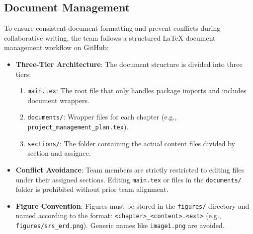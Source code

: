 \subsection{Document Management}

To ensure consistent document formatting and prevent conflicts during collaborative writing, the team follows a structured LaTeX document management workflow on GitHub:
\begin{itemize}
    \item \textbf{Three-Tier Architecture}: The document structure is divided into three tiers:
    \begin{enumerate}
        \item \texttt{main.tex}: The root file that only handles package imports and includes document wrappers.
        \item \texttt{documents/}: Wrapper files for each chapter (e.g., \texttt{project\_management\_plan.tex}).
        \item \texttt{sections/}: The folder containing the actual content files divided by section and assignee.
    \end{enumerate}
    \item \textbf{Conflict Avoidance}: Team members are strictly restricted to editing files under their assigned sections. Editing \texttt{main.tex} or files in the \texttt{documents/} folder is prohibited without prior team alignment.
    \item \textbf{Figure Convention}: Figures must be stored in the \texttt{figures/} directory and named according to the format: \texttt{<chapter>\_<content>.<ext>} (e.g., \texttt{figures/srs\_erd.png}). Generic names like \texttt{image1.png} are avoided.
\end{itemize}
